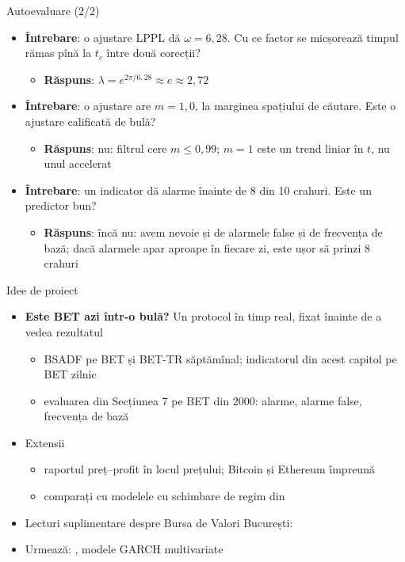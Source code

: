 \begin{frame}{Autoevaluare (2/2)}
\itemsize{\small}
\begin{itemize}
    \item \textbf{Întrebare}: o ajustare LPPL dă $\omega = 6{,}28$. Cu ce factor se micșorează timpul rămas pînă la $t_c$ între două corecții?
    \begin{itemize}
        \item \textbf{Răspuns}: $\lambda = e^{2\pi/6{,}28} \approx e \approx 2{,}72$
    \end{itemize}
    \item \textbf{Întrebare}: o ajustare are $m = 1{,}0$, la marginea spațiului de căutare. Este o ajustare calificată de bulă?
    \begin{itemize}
        \item \textbf{Răspuns}: nu: filtrul cere $m \le 0{,}99$; $m = 1$ este un trend liniar în $t$, nu unul accelerat
    \end{itemize}
    \item \textbf{Întrebare}: un indicator dă alarme înainte de 8 din 10 crahuri. Este un predictor bun?
    \begin{itemize}
        \item \textbf{Răspuns}: încă nu: avem nevoie și de alarmele false și de frecvența de bază; dacă alarmele apar aproape în fiecare zi, este ușor să prinzi 8 crahuri
    \end{itemize}
\end{itemize}
\end{frame}

\begin{frame}{Idee de proiect}
\itemsize{\small}
\begin{itemize}
    \item \textbf{Este BET azi într-o bulă?} Un protocol în timp real, fixat înainte de a vedea rezultatul
    \begin{itemize}
        \item BSADF pe BET și BET-TR săptămînal; indicatorul din acest capitol pe BET zilnic
        \item evaluarea din Secțiunea 7 pe BET din 2000: alarme, alarme false, frecvența de bază
    \end{itemize}
    \item Extensii
    \begin{itemize}
        \item raportul preț--profit în locul prețului; Bitcoin și Ethereum împreună
        \item comparați cu modelele cu schimbare de regim din 
    \end{itemize}
    \item Lecturi suplimentare despre Bursa de Valori București: 
    \item Urmează: , modele GARCH multivariate
\end{itemize}
\end{frame}


